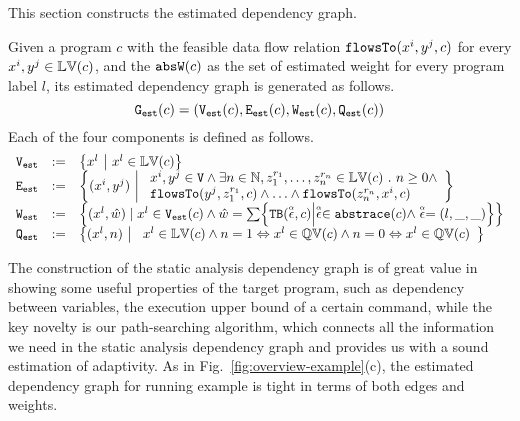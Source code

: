 This section constructs the estimated dependency graph.
\begin{defn}
\label{def:prog_graph}
Given a program $c$ 
with the feasible data flow relation $\mathtt{flowsTo}(x^i, y^j, c)$ for every $x^i, y^j \in \mathbb{LV}(c)$, 
and the $\mathtt{abs}{\mathtt{W}}(c)$ as the set of estimated weight for every program label $l$,
its estimated dependency graph
is generated as follows.
\[\mathtt{{G_{est}}}(c) = (\mathtt{{V_{est}}}(c), \mathtt{{E_{est}}}(c), \mathtt{{W_{est}}}(c), \mathtt{{Q_{est}}}(c))\]
Each of the four components is defined as follows.
{\small
\[
\begin{array}{lll}
\progV & := & \left\{ 
x^l
~ \middle\vert ~
x^l \in \lvar(c)
\right\}
\\
\progE & := & 
\left\{ 
(x^i, y^j) 
~ \middle\vert ~
\begin{array}{l}
x^i, y^j \in \vertxs
\land
\exists n \in \mathbb{N}, z_1^{r_1}, \ldots, z_n^{r_n} \in \lvar(c) \st
n \geq 0 \land
\\
\flowsto(y^j, z_1^{r_1}, c) 
\land \ldots \land \flowsto(z_n^{r_n}, x^i, c) 
\end{array}
\right\}
\\
\progW & := &
\left\{ (x^l, \hat{w}) 
\mid
x^l \in \progV(c) \land 
\hat{w} = 
\sum\left\{ \absclr(\absevent, c) \middle\vert \absevent \in \absflow(c) \land \absevent = (l, \_, \_) \right\}
\right\}
\\
\progF & := & 
\left\{(x^l, n) 
~ \middle\vert ~
\begin{array}{l}
 x^l \in \lvar(c) \land
 n = 1 \Leftrightarrow x^l \in \qvar(c)
\land n = 0 \Leftrightarrow x^l \in \qvar(c)
\end{array}
\right\}
\end{array}
\] }
\end{defn}
The construction of the static analysis dependency graph is of great value in showing some useful properties of the target program,
such as dependency between variables, the execution upper bound of a certain command,
while the key novelty is our path-searching algorithm, which connects all the information we need in the static analysis dependency graph and provides us with a sound estimation of adaptivity.
As in Fig.~\ref{fig:overview-example}(c), the estimated dependency graph for
running example is tight in terms of both edges and weights.
